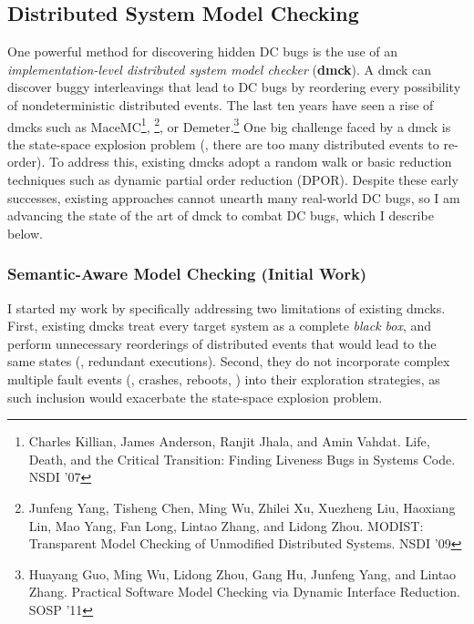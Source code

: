 \documentclass[10pt]{article}
\begin{document}


\subsection{Distributed System Model Checking}

One powerful method for discovering hidden DC bugs is the use of an
\textit{implementation-level distributed system model checker} (\textbf{dmck}).
A dmck can discover buggy interleavings that lead to DC bugs by reordering
every possibility of nondeterministic distributed events. The last ten years
have seen a rise of dmcks such as 
%
MaceMC\footnote{Charles Killian, James Anderson, Ranjit Jhala,
and Amin Vahdat. Life, Death, and the Critical Transition: Finding Liveness Bugs
in Systems Code. NSDI '07}, 
%
\modist\footnote{Junfeng Yang, Tisheng Chen, Ming
Wu, Zhilei Xu, Xuezheng Liu, Haoxiang Lin, Mao Yang, Fan Long, Lintao Zhang, and
Lidong Zhou. MODIST: Transparent Model Checking of Unmodified Distributed
Systems. NSDI '09}, or Demeter.\footnote{Huayang Guo, Ming Wu, Lidong Zhou, Gang
Hu, Junfeng Yang, and Lintao Zhang. Practical Software Model Checking via
Dynamic Interface Reduction. SOSP '11} One big challenge faced by a dmck is the
state-space explosion problem (\ie, there are too many distributed events to
re-order). To address this, existing dmcks adopt a random walk or basic
reduction techniques such as dynamic partial order reduction (DPOR). Despite
these early successes, existing approaches cannot unearth many real-world DC
bugs, so I am advancing the state of the art of dmck to combat DC bugs, which I
describe below.

\subsubsection*{Semantic-Aware Model Checking (Initial Work)} 

I started my work by specifically addressing two limitations of existing dmcks.
First, existing dmcks treat every target system as a complete \textit{black
box}, and perform unnecessary reorderings of distributed events that would lead
to the same states (\ie, redundant executions). Second, they do not incorporate
complex multiple fault events (\eg, crashes, reboots, \etc) into their exploration
strategies, as such inclusion would exacerbate the state-space explosion
problem.
\end{document}
